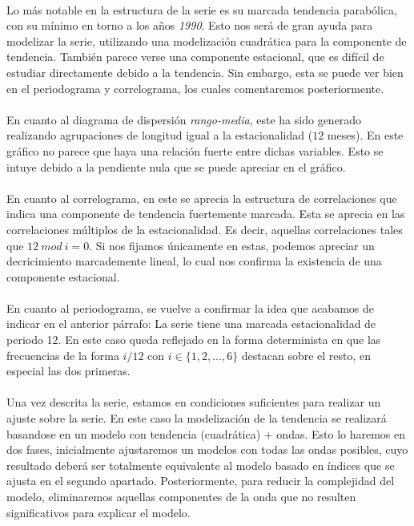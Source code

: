 \documentclass[a4paper, spanish]{article}
\begin{document}
    \paragraph{}
    Lo más notable en la estructura de la serie es su marcada tendencia parabólica, con su mínimo en torno a los años \emph{1990}. Esto nos será de gran ayuda para modelizar la serie, utilizando una modelización cuadrática para la componente de tendencia. También parece verse una componente estacional, que es difícil de estudiar directamente debido a la tendencia. Sin embargo, esta se puede ver bien en el periodograma y correlograma, los cuales comentaremos posteriormente.

    \paragraph{}
    En cuanto al diagrama de dispersión \emph{rango-media}, este ha sido generado realizando agrupaciones de longitud igual a la estacionalidad ($12$ meses). En este gráfico no parece que haya una relación fuerte entre dichas variables. Esto se intuye debido a la pendiente nula que se puede apreciar en el gráfico.

    \paragraph{}
    En cuanto al correlograma, en este se aprecia la estructura de correlaciones que indica una componente de tendencia fuertemente marcada. Esta se aprecia en las correlaciones múltiplos de la estacionalidad. Es decir, aquellas correlaciones tales que $12 \ mod \ i = 0$. Si nos fijamos únicamente en estas, podemos apreciar un decricimiento marcademente lineal, lo cual nos confirma la existencia de una componente estacional.

    \paragraph{}
    En cuanto al periodograma, se vuelve a confirmar la idea que acabamos de indicar en el anterior párrafo: La serie tiene una marcada estacionalidad de periodo 12. En este caso queda reflejado en la forma determinista en que las frecuencias de la forma $i/12$ con $i \in \{1, 2, ..., 6\}$ destacan sobre el resto, en especial las dos primeras.

    \paragraph{}
    Una vez descrita la serie, estamos en condiciones suficientes para realizar un ajuste sobre la serie. En este caso la modelización de la tendencia se realizará basandose en un modelo con tendencia (cuadrática) + ondas. Esto lo haremos en dos fases, inicialmente ajustaremos un modelos con todas las ondas posibles, cuyo resultado deberá ser totalmente equivalente al modelo basado en índices que se ajusta en el segundo apartado. Posteriormente, para reducir la complejidad del modelo, eliminaremos aquellas componentes de la onda que no resulten significativos para explicar el modelo.
\end{document}
